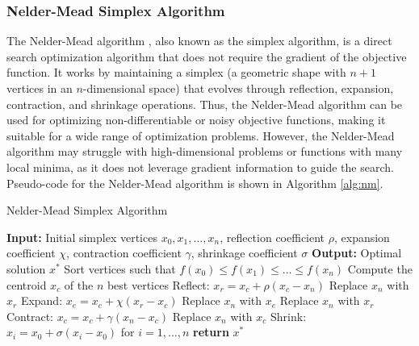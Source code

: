\documentclass{article}[11pt]
\begin{document}
\subsubsection*{Nelder-Mead Simplex Algorithm}
The Nelder-Mead algorithm \cite{NelderMead-1965}, also known as the simplex algorithm, is a direct search optimization algorithm that does not require the gradient of the objective function.
It works by maintaining a simplex (a geometric shape with $n+1$ vertices in an $n$-dimensional space) that evolves through reflection, expansion, contraction, and shrinkage operations.
Thus, the Nelder-Mead algorithm can be used for optimizing non-differentiable or noisy objective functions, making it suitable for a wide range of optimization problems.
However, the Nelder-Mead algorithm may struggle with high-dimensional problems or functions with many local minima, as it does not leverage gradient information to guide the search.
Pseudo-code for the Nelder-Mead algorithm is shown in Algorithm \ref{alg:nm}.
\begin{algorithm}[H]
\caption{Nelder-Mead Simplex Algorithm}\label{alg:nm}
\begin{algorithmic}[1]
\State \textbf{Input:} Initial simplex vertices $x_0, x_1, \ldots, x_n$, reflection coefficient $\rho$, expansion coefficient $\chi$, contraction coefficient $\gamma$, shrinkage coefficient $\sigma$
\State \textbf{Output:} Optimal solution $x^*$
\State Sort vertices such that $f(x_0) \leq f(x_1) \leq \ldots \leq f(x_n)$
    \State Compute the centroid $x_c$ of the $n$ best vertices
    \State Reflect: $x_r = x_c + \rho(x_c - x_n)$
        \State Replace $x_n$ with $x_r$
        \State Expand: $x_e = x_c + \chi(x_r - x_c)$
            \State Replace $x_n$ with $x_e$
        \Else
            \State Replace $x_n$ with $x_r$
        \EndIf
    \Else
        \State Contract: $x_c = x_c + \gamma(x_n - x_c)$
            \State Replace $x_n$ with $x_c$
        \Else
            \State Shrink: $x_i = x_0 + \sigma(x_i - x_0)$ for $i = 1, \ldots, n$
        \EndIf
    \EndIf
\EndWhile
\State \textbf{return} $x^*$
\end{algorithmic}
\end{algorithm}
\end{document}
